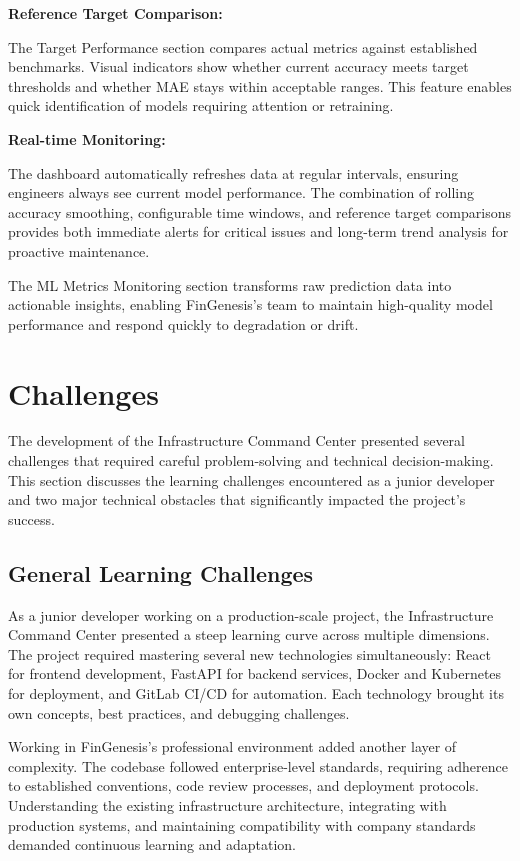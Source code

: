 \textbf{Reference Target Comparison:}

The Target Performance section compares actual metrics against established benchmarks. Visual indicators show whether current accuracy meets target thresholds and whether MAE stays within acceptable ranges. This feature enables quick identification of models requiring attention or retraining.

\textbf{Real-time Monitoring:}

The dashboard automatically refreshes data at regular intervals, ensuring engineers always see current model performance. The combination of rolling accuracy smoothing, configurable time windows, and reference target comparisons provides both immediate alerts for critical issues and long-term trend analysis for proactive maintenance.

The ML Metrics Monitoring section transforms raw prediction data into actionable insights, enabling FinGenesis's team to maintain high-quality model performance and respond quickly to degradation or drift.

\section{Challenges}

The development of the Infrastructure Command Center presented several challenges that required careful problem-solving and technical decision-making. This section discusses the learning challenges encountered as a junior developer and two major technical obstacles that significantly impacted the project's success.

\subsection{General Learning Challenges}

As a junior developer working on a production-scale project, the Infrastructure Command Center presented a steep learning curve across multiple dimensions. The project required mastering several new technologies simultaneously: React for frontend development, FastAPI for backend services, Docker and Kubernetes for deployment, and GitLab CI/CD for automation. Each technology brought its own concepts, best practices, and debugging challenges.

Working in FinGenesis's professional environment added another layer of complexity. The codebase followed enterprise-level standards, requiring adherence to established conventions, code review processes, and deployment protocols. Understanding the existing infrastructure architecture, integrating with production systems, and maintaining compatibility with company standards demanded continuous learning and adaptation.

